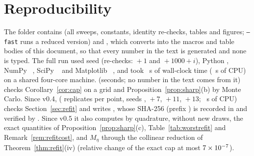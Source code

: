 \documentclass[10pt,a4paper]{article}
\theoremstyle{plain}
\theoremstyle{definition}
\theoremstyle{remark}
\begin{document}
\appendix
\section{Reproducibility}\label{app:repro}
{\sloppy The folder contains  (all sweeps, constants, identity re-checks, tables and figures; \texttt{--fast} runs a reduced version) and , which converts  into the macros and table bodies of this document, so that every number in the text is generated and none is typed. The full run used seed \MetaSeed{} (re-checks: \MetaSeed{}${}+1$ and \MetaSeed{}${}+1000+i$), Python \MetaPython, NumPy \MetaNumpy~\citep{harris2020}, SciPy \MetaScipy~\citep{virtanen2020} and Matplotlib \MetaMpl~\citep{hunter2007}, and took \MetaSeconds{}~s of wall-clock time (\MetaCPUSeconds{}~s of CPU) on a shared four-core machine.  (seconds; no number in the text comes from it) checks Corollary~\ref{cor:cap} on a grid and Proposition~\ref{prop:sharp}(b) by Monte Carlo. Since v0.4,  (\RfReps{} replicates per point, seeds \MetaSeed, ${}+7$, ${}+11$, ${}+13$; \RfCPU~s of CPU) checks Section~\ref{sec:refit} and writes , whose SHA-256 (prefix \texttt{\RfSHA}) is recorded in  and verified by . Since v0.5 it also computes by quadrature, without new draws, the exact quantities of Proposition~\ref{prop:sharp}(c), Table~\ref{tab:worstrefit} and Remark~\ref{rem:refitcost}, and $M_\eta$ through the collinear reduction of Theorem~\ref{thm:refit}(iv) (relative change of the exact cap at most $7\times10^{-7}$).\par}
\end{document}
